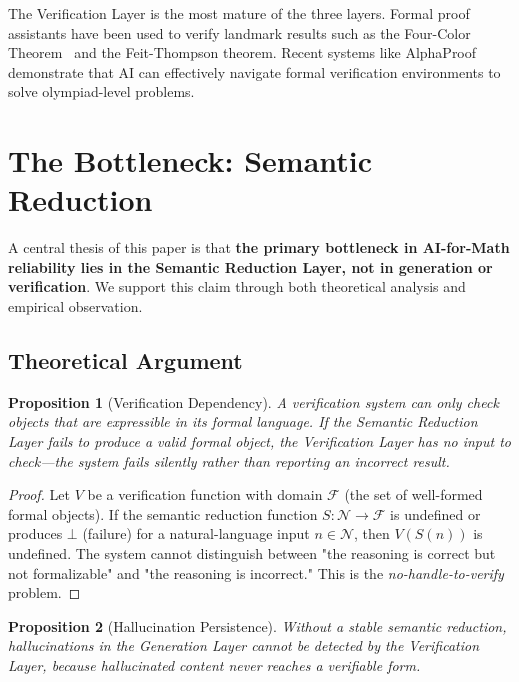 \documentclass[11pt,a4paper]{article}
\newtheorem{proposition}{Proposition}
\begin{document}
The Verification Layer is the most mature of the three layers. Formal proof assistants have been used to verify landmark results such as the Four-Color Theorem~\cite{appel1977solution} and the Feit-Thompson theorem. Recent systems like AlphaProof~\cite{hubert2025alphaproof} demonstrate that AI can effectively navigate formal verification environments to solve olympiad-level problems.

\section{The Bottleneck: Semantic Reduction}
\label{sec:bottleneck}

A central thesis of this paper is that \textbf{the primary bottleneck in AI-for-Math reliability lies in the Semantic Reduction Layer, not in generation or verification}. We support this claim through both theoretical analysis and empirical observation.

\subsection{Theoretical Argument}

\begin{proposition}[Verification Dependency]
A verification system can only check objects that are expressible in its formal language. If the Semantic Reduction Layer fails to produce a valid formal object, the Verification Layer has no input to check---the system fails \textit{silently} rather than reporting an incorrect result.
\end{proposition}

\begin{proof}
Let $V$ be a verification function with domain $\mathcal{F}$ (the set of well-formed formal objects). If the semantic reduction function $S: \mathcal{N} \to \mathcal{F}$ is undefined or produces $\bot$ (failure) for a natural-language input $n \in \mathcal{N}$, then $V(S(n))$ is undefined. The system cannot distinguish between "the reasoning is correct but not formalizable" and "the reasoning is incorrect." This is the \textit{no-handle-to-verify} problem.
\end{proof}

\begin{proposition}[Hallucination Persistence]
Without a stable semantic reduction, hallucinations in the Generation Layer cannot be detected by the Verification Layer, because hallucinated content never reaches a verifiable form.
\end{proposition}
\end{document}
